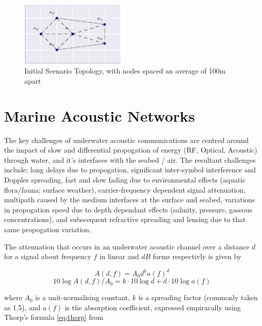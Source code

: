 \documentclass[runningheads,a4paper]{llncs}
\begin{document}
\begin{figure}[h]
  \centering
  \includegraphics[width=0.45\textwidth]{img/s1_layout.pdf}
  \caption{Initial Scenario Topology, with nodes spaced an average of 100m apart}
  \label{fig:s1_layout}
\end{figure}

\section{Marine Acoustic Networks}\label{sec:marineacousticnetworks}

The key challenges of underwater acoustic communications are centred around the impact of slow and differential propogation of energy (RF, Optical, Acoustic) through water, and it's interfaces with the seabed / air.
The resultant challenges include; long delays due to propogation, significant inter-symbol interference and Doppler spreading, fast and slow fading due to environmental effects (aquatic flora/fauna; surface weather), carrier-frequency dependent signal attenuation, multipath caused by the medium interfaces at the surface and seabed, variations in propogation speed due to depth dependant effects (salinity, pressure, gaseous concentrations), and subscequent refractive spreading and lensing due to that same propogation variation. 

The attenuation that occurs in an underwater acoustic channel over a distance $d$ for a signal about frequency $f$ in linear and $dB$ forms respectivly is given by

\begin{equation}
  \label{eq:acoattenuation}
  A(d,f) = A_0d^ka(f)^d
\end{equation}
\begin{equation}
  \label{eq:acoattenuationdb}
  10 \log A(d,f)/A_0 = k \cdot 10 \log d + d \cdot 10 \log a(f)
\end{equation}

where $A_0$ is a unit-normalising constant, $k$ is a spreading factor (commonly taken as 1.5), and $a(f)$ is the absorption coefficient, expressed empiracally using Thorp's formula \eqref{eq:thorp} from \cite{Stojanovic2007}
\end{document}
